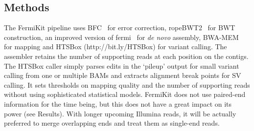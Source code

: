 \documentclass{bioinfo}
\begin{document}
\begin{methods}
\section{Methods}
The FermiKit pipeline uses BFC~\citep{Li:2015aa-tmp} for error correction,
ropeBWT2~\citep{Li:2014ab} for BWT construction, an improved version of
fermi~\citep{Li:2012fk} for {\it de novo} assembly, BWA-MEM~\citep{Li:2013aa}
for mapping and HTSBox (http://bit.ly/HTSBox) for variant calling. The
assembler retains the number of supporting reads at each position on the
contigs. The HTSBox caller simply parses edits in the `pileup' output for small
variant calling from one or multiple BAMs and extracts alignment break points
for SV calling. It sets thresholds on mapping quality and the number of
supporting reads without using sophisticated statistical models. FermiKit
does not use paired-end information for the time being, but this does not have
a great impact on its power (see Results). With longer upcoming Illumina reads,
it will be actually preferred to merge overlapping ends and treat them as
single-end reads.

\end{methods}
\end{document}
